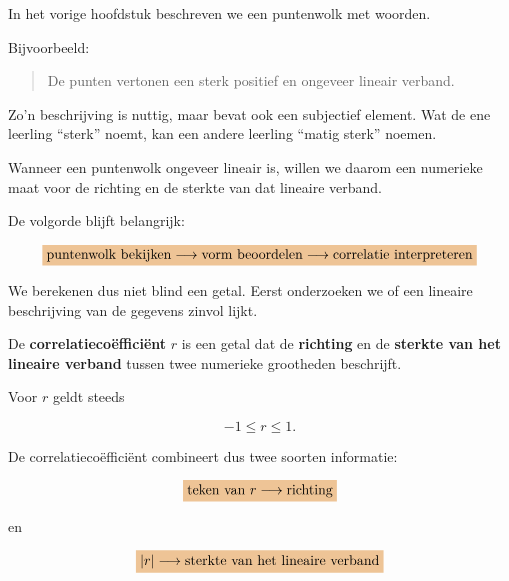 \documentclass{ximera}
\begin{document}

In het vorige hoofdstuk beschreven we een puntenwolk met woorden.

Bijvoorbeeld:

\begin{quote}
De punten vertonen een sterk positief en ongeveer lineair verband.
\end{quote}

Zo'n beschrijving is nuttig, maar bevat ook een subjectief element.
Wat de ene leerling ``sterk'' noemt, kan een andere leerling
``matig sterk'' noemen.

Wanneer een puntenwolk ongeveer lineair is, willen we daarom een
numerieke maat voor de richting en de sterkte van dat lineaire verband.

\begin{opmerking}
De volgorde blijft belangrijk:

\[
\important{
\text{puntenwolk bekijken}
\longrightarrow
\text{vorm beoordelen}
\longrightarrow
\text{correlatie interpreteren}
}
\]

We berekenen dus niet blind een getal. Eerst onderzoeken we of een
lineaire beschrijving van de gegevens zinvol lijkt.
\end{opmerking}



\begin{definitie}
De \textbf{correlatiecoëfficiënt} $r$ is een getal dat de
\textbf{richting} en de \textbf{sterkte van het lineaire verband}
tussen twee numerieke grootheden beschrijft.

Voor $r$ geldt steeds

\[
\boxed{-1\leq r\leq 1}.
\]
\end{definitie}

De correlatiecoëfficiënt combineert dus twee soorten informatie:

\[
\important{
\text{teken van }r
\longrightarrow
\text{richting}
}
\]

en

\[
\important{
|r|
\longrightarrow
\text{sterkte van het lineaire verband}
}
\]


\end{document}
